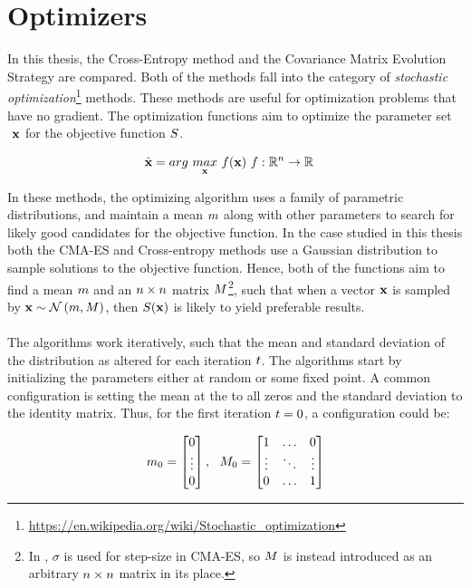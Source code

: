 \section{Optimizers}

In this thesis, the Cross-Entropy method and the Covariance Matrix Evolution 
Strategy are compared. Both of the methods fall into the category of 
\textit{stochastic optimization}\footnote{\url{https://en.wikipedia.org/wiki/Stochastic_optimization}}
methods. These methods are useful for optimization problems that have no gradient.
The optimization functions aim to optimize the parameter set $\textbf{ \individual }$
for the objective function $S$.

\begin{align*}
\hat{\textbf{x}} &= arg \  \underset{\textbf{x}}{max} \  f(\textbf{x}) \ f : \mathbb{R}^{n } \rightarrow \mathbb{R}
\end{align*}

In these methods, the optimizing algorithm uses a family of parametric distributions,
and maintain a mean $m $ along with other parameters
to search for likely good candidates for the objective function.  In the case studied in this thesis
both the CMA-ES and Cross-entropy methods use a Gaussian distribution to sample solutions to the objective function.
Hence, both of the functions aim to find a mean $m $ and an $n \times n$ matrix 
$M $\footnote{In \citep{hansen2011}, $\sigma$ is used for step-size in CMA-ES, so $M $ is instead introduced
as an arbitrary $n \times n$ matrix in its place.}, such that when
a vector $\textbf{\individual }$ is sampled by $\textbf{x} \sim \mathcal{N}\left( m, M \right)$, then $S (\textbf{x})$ 
is likely to yield preferable results.\\
\\
The algorithms work iteratively, such that the mean and standard deviation of the distribution 
as altered for each iteration $t $.
The algorithms start by initializing the parameters either at random or some fixed point. A common 
configuration is setting the mean at the to all zeros and the standard deviation to the identity matrix.
Thus, for the first iteration $t = 0$, a configuration could be:

\begin{align*}
\mean_{0} =
\begin{bmatrix}
0\\
\vdots\\
0
\end{bmatrix},\ \ 
\varianceMatrix _{0} = 
\begin{bmatrix}
1 & \hdots & 0\\
\vdots & \ddots & \vdots\\
0 & \hdots & 1
\end{bmatrix}
\end{align*}

